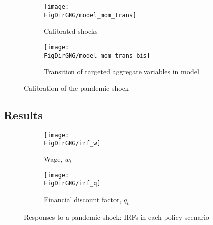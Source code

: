 \documentclass[11pt,english]{article}
\newcommand*{\FigDirGNG}{../figures/grant_vs_nogrant} %
\begin{document}
      
\begin{figure}[htbp]
	\centering
	\begin{subfigure}[b]{0.45\textwidth}
		\centering
		\texttt{[image: \\FigDirGNG/model\_mom\_trans]}
		\caption{Calibrated shocks}
	\end{subfigure} \hfill
	\begin{subfigure}[b]{0.45\textwidth}
		\centering
		\texttt{[image: \\FigDirGNG/model\_mom\_trans\_bis]}
		\caption{Transition of targeted aggregate variables in model}
	\end{subfigure}
\caption{Calibration of the pandemic shock}
\vspace{1ex}

\end{figure}

\FloatBarrier

\subsection{Results}


\begin{figure}[htbp]
	\centering
	\begin{subfigure}[b]{0.46\textwidth}
		\centering
		\texttt{[image: \\FigDirGNG/irf\_w]}
		\caption{Wage, $ w_t $}
	\end{subfigure} \hfill
	\begin{subfigure}[b]{0.46\textwidth}
		\centering
		\texttt{[image: \\FigDirGNG/irf\_q]}
		\caption{Financial discount factor, $ q_t $}
	\end{subfigure} 
	
	\caption{Responses to a pandemic shock: IRFs in each policy scenario}
	\label{fig:grant_vs_nogrant0}
\end{figure}
	
\end{document}
